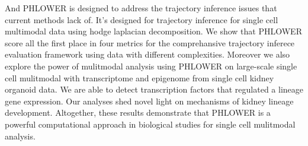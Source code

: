 And PHLOWER is designed to address the trajectory inference issues that current methods lack of. It's designed for trajectory inference for single cell multimodal data using hodge laplacian decomposition. We show that PHLOWER score all the first place in four metrics for the comprehansive trajectory inferece evaluation framework using data with different complexities. Moreover we also explore the power of mulitmodal analysis using PHLOWER on large-scale single cell mulitmodal with transcriptome and epigenome from single cell kidney organoid data. We are able to detect transcription factors that regulated a lineage gene expression. Our analyses shed novel light on mechanisms of kidney lineage development. Altogether, these results demonstrate that PHLOWER is a powerful computational approach in biological studies for single cell mulitmodal analysis.

